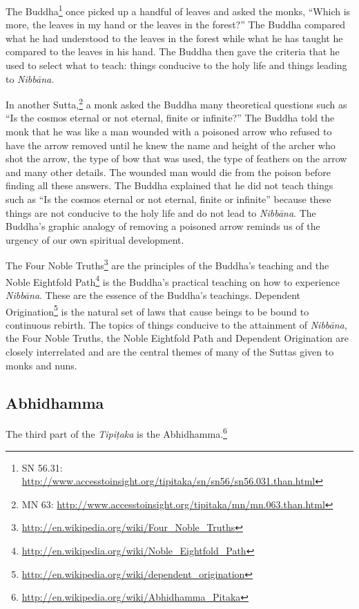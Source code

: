 The Buddha\footnote{SN 56.31: \url{http://www.accesstoinsight.org/tipitaka/sn/sn56/sn56.031.than.html}} once picked up a handful of leaves and asked the monks, “Which is more, the leaves in my hand or the leaves in the forest?” The Buddha compared what he had understood to the leaves in the forest while what he has taught he compared to the leaves in his hand. The Buddha then gave the criteria that he used to select what to teach: things conducive to the holy life and things leading to \textit{Nibbāna}.

In another Sutta,\footnote{MN 63: \url{http://www.accesstoinsight.org/tipitaka/mn/mn.063.than.html}} a monk asked the Buddha many theoretical questions such as “Is the cosmos eternal or not eternal, finite or infinite?” The Buddha told the monk that he was like a man wounded with a poisoned arrow who refused to have the arrow removed until he knew the name and height of the archer who shot the arrow, the type of bow that was used, the type of feathers on the arrow and many other details. The wounded man would die from the poison before finding all these answers. The Buddha explained that he did not teach things such as “Is the cosmos eternal or not eternal, finite or infinite” because these things are not conducive to the holy life and do not lead to \textit{Nibbāna}. The Buddha’s graphic analogy of removing a poisoned arrow reminds us of the urgency of our own spiritual development.

The Four Noble Truths\footnote{\url{http://en.wikipedia.org/wiki/Four_Noble_Truths}} are the principles of the Buddha’s teaching and the Noble Eightfold Path\footnote{\url{http://en.wikipedia.org/wiki/Noble_Eightfold_Path}} is the Buddha’s practical teaching on how to experience \textit{Nibbāna}. These are the essence of the Buddha’s teachings. Dependent Origination\footnote{\url{http://en.wikipedia.org/wiki/dependent_origination}} is the natural set of laws that cause beings to be bound to continuous rebirth. The topics of things conducive to the attainment of \textit{Nibbāna}, the Four Noble Truths, the Noble Eightfold Path and Dependent Origination are closely interrelated and are the central themes of many of the Suttas given to monks and nuns.

\pagebreak

\subsection*{Abhidhamma}

The third part of the \textit{Tipiṭaka} is the Abhidhamma.\footnote{\url{http://en.wikipedia.org/wiki/Abhidhamma_Pitaka}}

